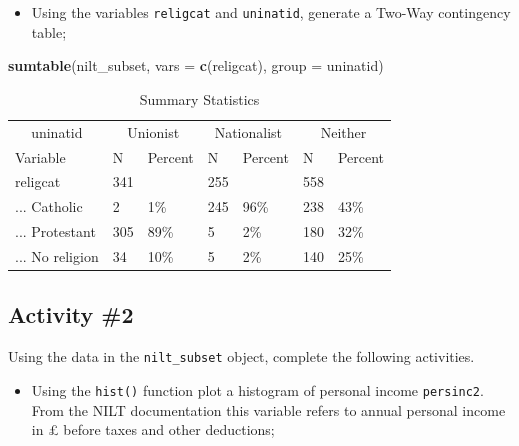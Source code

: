 \documentclass[
]{book}
\newenvironment{Shaded}{\begin{snugshade}}{\end{snugshade}}
\newcommand{\AttributeTok}[1]{\textcolor[rgb]{0.13,0.29,0.53}{#1}}
\newcommand{\FunctionTok}[1]{\textcolor[rgb]{0.13,0.29,0.53}{\textbf{#1}}}
\newcommand{\NormalTok}[1]{#1}
\newcommand{\StringTok}[1]{\textcolor[rgb]{0.31,0.60,0.02}{#1}}
\providecommand{\tightlist}{%
  \setlength{\itemsep}{0pt}\setlength{\parskip}{0pt}}
\begin{document}
\begin{itemize}
\tightlist
\item
  Using the variables \texttt{religcat} and \texttt{uninatid}, generate a Two-Way contingency table;
\end{itemize}

\begin{Shaded}
\begin{Highlighting}[]
\FunctionTok{sumtable}\NormalTok{(nilt\_subset, }\AttributeTok{vars =} \FunctionTok{c}\NormalTok{(}\StringTok{\textquotesingle{}religcat\textquotesingle{}}\NormalTok{), }\AttributeTok{group =} \StringTok{\textquotesingle{}uninatid\textquotesingle{}}\NormalTok{)}
\end{Highlighting}
\end{Shaded}

\begin{table}

\caption{\label{tab:unnamed-chunk-121}Summary Statistics}
\centering
\begin{tabular}[t]{lllllll}
\toprule
\multicolumn{1}{c}{uninatid} & \multicolumn{2}{c}{Unionist} & \multicolumn{2}{c}{Nationalist} & \multicolumn{2}{c}{Neither} \\
\cmidrule(l{3pt}r{3pt}){1-1} \cmidrule(l{3pt}r{3pt}){2-3} \cmidrule(l{3pt}r{3pt}){4-5} \cmidrule(l{3pt}r{3pt}){6-7}
Variable & N & Percent & N & Percent & N & Percent\\
\midrule
religcat & 341 &  & 255 &  & 558 & \\
... Catholic & 2 & 1\% & 245 & 96\% & 238 & 43\%\\
... Protestant & 305 & 89\% & 5 & 2\% & 180 & 32\%\\
... No religion & 34 & 10\% & 5 & 2\% & 140 & 25\%\\
\bottomrule
\end{tabular}
\end{table}

\hypertarget{activity-2-4}{%
\subsection{Activity \#2}\label{activity-2-4}}

Using the data in the \texttt{nilt\_subset} object, complete the following activities.

\begin{itemize}
\tightlist
\item
  Using the \texttt{hist()} function plot a histogram of personal income \texttt{persinc2}. From the NILT documentation this variable refers to annual personal income in £ before taxes and other deductions;
\end{itemize}
\end{document}
